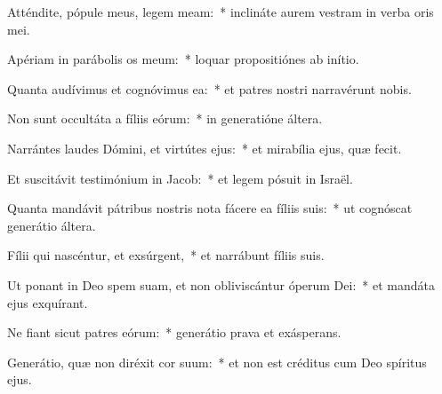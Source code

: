 \item Atténdite, pópule meus, legem meam:~* inclináte aurem vestram in verba oris mei.

\item Apériam in parábolis os meum:~* loquar propositiónes ab inítio.

\item Quanta audívimus et cognóvimus ea:~* et patres nostri narravérunt nobis.

\item Non sunt occultáta a fíliis eórum:~* in generatióne áltera.

\item Narrántes laudes Dómini, et virtútes ejus:~* et mirabília ejus, quæ fecit.

\item Et suscitávit testimónium in Jacob:~* et legem pósuit in Israël.

\item Quanta mandávit pátribus nostris nota fácere ea fíliis suis:~* ut cognóscat generátio áltera.

\item Fílii qui nascéntur, et exsúrgent,~* et narrábunt fíliis suis.

\item Ut ponant in Deo spem suam, et non obliviscántur óperum Dei:~* et mandáta ejus exquírant.

\item Ne fiant sicut patres eórum:~* generátio prava et exásperans.

\item Generátio, quæ non diréxit cor suum:~* et non est créditus cum Deo spíritus ejus.
